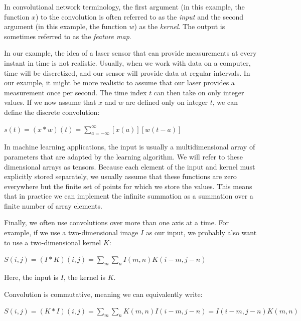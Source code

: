 \documentclass{report}
\begin{document}
\noindent In convolutional network terminology, the first argument (in this example, the function $x$) to the convolution is often referred to as the \textit{input} and the second argument (in this example, the function $w$) as the \textit{kernel}. The output is sometimes referred to as the \textit{feature map}.\newline

\noindent In our example, the idea of a laser sensor that can provide measurements at every instant in time is not realistic. Usually, when we work with data on a computer, time will be discretized, and our sensor will provide data at regular intervals. In our example, it might be more realistic to assume that our laser provides a measurement once per second. The time index $t$ can then take on only integer values. If we now assume that $x$ and $w$ are defined only on integer $t$, we can define the discrete convolution:\newline\newline
    \centerline{$s(t) = (x * w)(t) = \sum_{a=-\infty}^{\infty}[x(a)][w(t-a)]$}\newline\newline
In machine learning applications, the input is usually a multidimensional array of parameters that are adapted by the learning algorithm. We will refer to these dimensional arrays as tensors. Because each element of the input and kernel must explicitly stored separately, we usually assume that these functions are zero everywhere but the finite set of points for which we store the values. This means that in practice we can implement the infinite summation as a summation over a finite number of array elements.\newline

\noindent Finally, we often use convolutions over more than one axis at a time. For example, if we use a two-dimensional image $I$ as our input, we probably also want to use a two-dimensional kernel $K$:\newline\newline
    \centerline{$S(i,j)=(I*K)(i,j)=\sum_m \sum_n I(m,n)K(i-m,j-n)$}\newline\newline
    
Here, the input is $I$, the kernel is $K$.\newline

Convolution is commutative, meaning we can equivalently write:\newline\newline
    \centerline{$S(i,j)=(K*I)(i,j)=\sum_m \sum_n K(m,n)I(i-m,j-n)=I(i-m,j-n)K(m,n)$}\newline\newline
\end{document}
